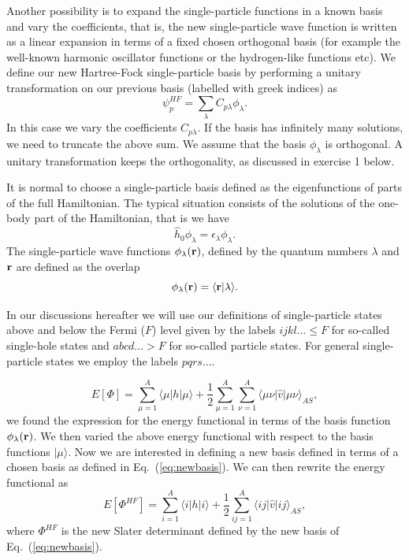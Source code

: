 Another possibility is to expand the single-particle functions in a
known basis and vary the coefficients, that is, the new
single-particle wave function is written as a linear expansion in
terms of a fixed chosen orthogonal basis (for example the well-known
harmonic oscillator functions or the hydrogen-like functions etc).  We
define our new Hartree-Fock single-particle basis by performing a
unitary transformation on our previous basis (labelled with greek
indices) as
\begin{equation}
\psi_p^{HF}  = \sum_{\lambda} C_{p\lambda}\phi_{\lambda}. \label{eq:newbasis}
\end{equation}
In this case we vary the coefficients $C_{p\lambda}$. If the basis has
infinitely many solutions, we need to truncate the above sum.  We
assume that the basis $\phi_{\lambda}$ is orthogonal. A unitary
transformation keeps the orthogonality, as discussed in exercise 1
below.




It is normal to choose a single-particle basis defined as the
eigenfunctions of parts of the full Hamiltonian. The typical situation
consists of the solutions of the one-body part of the Hamiltonian,
that is we have
\[
\hat{h}_0\phi_{\lambda}=\epsilon_{\lambda}\phi_{\lambda}.
\]
The single-particle wave functions $\phi_{\lambda}({\bf r})$, defined
by the quantum numbers $\lambda$ and ${\bf r}$ are defined as the
overlap
\[
   \phi_{\lambda}({\bf r})  = \langle {\bf r} | \lambda \rangle .
\]




In our discussions hereafter we will use our definitions of
single-particle states above and below the Fermi ($F$) level given by
the labels $ijkl\dots \le F$ for so-called single-hole states and
$abcd\dots > F$ for so-called particle states.  For general
single-particle states we employ the labels $pqrs\dots$.





\[
  E[\Phi] = \sum_{\mu=1}^A \langle \mu | h | \mu \rangle
  + \frac{1}{2}\sum_{{\mu}=1}^A\sum_{{\nu}=1}^A \langle \mu\nu|\hat{v}|\mu\nu\rangle_{AS},
\]
we found the expression for the energy functional in terms of the
basis function $\phi_{\lambda}({\bf r})$. We then varied the above
energy functional with respect to the basis functions $|\mu \rangle$.
Now we are interested in defining a new basis defined in terms of a
chosen basis as defined in Eq.~(\ref{eq:newbasis}). We can then rewrite
the energy functional as
\begin{equation}
  E[\Phi^{HF}] 
  = \sum_{i=1}^A \langle i | h | i \rangle +
  \frac{1}{2}\sum_{ij=1}^A\langle ij|\hat{v}|ij\rangle_{AS}, \label{FunctionalEPhi2}
\end{equation}
where $\Phi^{HF}$ is the new Slater determinant defined by the new
basis of Eq.~(\ref{eq:newbasis}).






